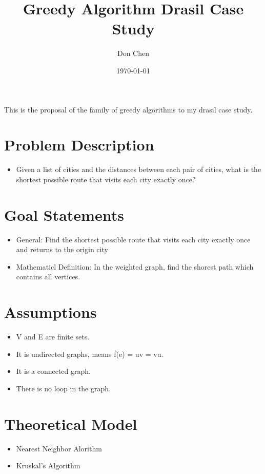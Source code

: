 \documentclass[12pt]{article}
\title{Greedy Algorithm Drasil Case Study}
\author{Don Chen}
\date{\today}
\begin{document}
\maketitle
This is the proposal of the family of greedy algorithms to my drasil case study.

\section{Problem Description}
\begin{itemize}
    \item Given a list of cities and the distances between each pair of cities, 
    what is the shortest possible route that visits each city exactly once?
\end{itemize}

\section{Goal Statements}
\begin{itemize}
    \item General: Find the shortest possible route that visits each city exactly once and returns to the origin city
    \item Mathematicl Definition: In the weighted graph, find the shorest path which contains all vertices.
\end{itemize}

\section{Assumptions}
\begin{itemize}
    \item V and E are finite sets. 
    \item It is undirected graphs, means f(e) = uv = vu.
    \item It is a connected graph.
    \item There is no loop in the graph.
\end{itemize}

\section{Theoretical Model}
\begin{itemize}
    \item Nearest Neighbor Alorithm
    \item Kruskal’s Algorithm
\end{itemize}
\end{document}
